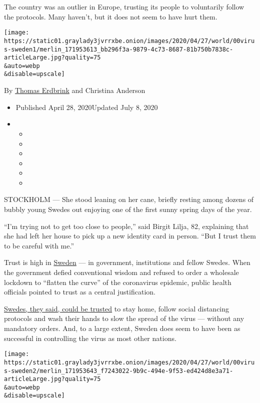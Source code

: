 The country was an outlier in Europe, trusting its people to voluntarily
follow the protocols. Many haven't, but it does not seem to have hurt
them.

\texttt{[image: https://static01.graylady3jvrrxbe.onion/images/2020/04/27/world/00virus-sweden1/merlin\_171953613\_bb296f3a-9879-4c73-8687-81b750b7838c-articleLarge.jpg?quality=75\\\&auto=webp\\\&disable=upscale]}

By \href{https://www.nytimes3xbfgragh.onion/by/thomas-erdbrink}{Thomas
Erdbrink} and Christina Anderson

\begin{itemize}
\item
  Published April 28, 2020Updated July 8, 2020
\item
  \begin{itemize}
  \item
  \item
  \item
  \item
  \item
  \item
  \end{itemize}
\end{itemize}

STOCKHOLM --- She stood leaning on her cane, briefly resting among
dozens of bubbly young Swedes out enjoying one of the first sunny spring
days of the year.

``I'm trying not to get too close to people,'' said Birgit Lilja, 82,
explaining that she had left her house to pick up a new identity card in
person. ``But I trust them to be careful with me.''

Trust is high in
\href{https://www.nytimes3xbfgragh.onion/2020/06/22/world/europe/sweden-coronavirus-pariah-scandinavia.html}{Sweden}
--- in government, institutions and fellow Swedes. When the government
defied conventional wisdom and refused to order a wholesale lockdown to
``flatten the curve'' of the coronavirus epidemic, public health
officials pointed to trust as a central justification.

\href{https://www.nytimes3xbfgragh.onion/2020/03/28/world/europe/sweden-coronavirus.html}{Swedes,
they said, could be trusted} to stay home, follow social distancing
protocols and wash their hands to slow the spread of the virus ---
without any mandatory orders. And, to a large extent, Sweden does seem
to have been as successful in controlling the virus as most other
nations.

\texttt{[image: https://static01.graylady3jvrrxbe.onion/images/2020/04/27/world/00virus-sweden2/merlin\_171953643\_f7243022-9b9c-494e-9f53-ed424d8e3a71-articleLarge.jpg?quality=75\\\&auto=webp\\\&disable=upscale]}

